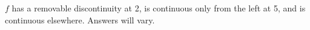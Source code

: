 {$f$ has a removable discontinuity at 2, is continuous only from the left at 5, and is continuous elsewhere.}
{Answers will vary.}
